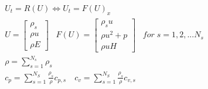 \documentclass[10pt]{article} %
\begin{document}
\color{fgC}\[\begin{matrix}
U_t = R(U)  \Leftrightarrow U_t = F(U)_x \\
U = \begin{bmatrix}
\rho_s \\
\rho u \\
\rho E
\end{bmatrix}\;\;\;
F(U) = \begin{bmatrix}
\rho_s u \\
\rho u^2 + p \\
\rho u H
\end{bmatrix}\;\;\; for\; s=1,2,...N_s \\
\rho = \sum_{s=1}^{N_s}\rho_s \\
c_p = \sum_{s=1}^{N_S} \frac{\rho_s}{\rho} c_{p,s} \quad  c_v = \sum_{s=1}^{N_S} \frac{\rho_s}{\rho} c_{v,s}
\end{matrix}  \]
\end{document}
